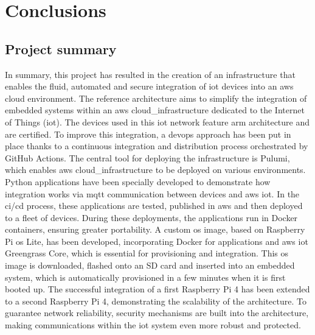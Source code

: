 %


\chapter{Conclusions}
\label{chap:conclusions}

\section{Project summary}

In summary, this project has resulted in the creation of an infrastructure that enables the fluid, automated and secure integration of \acrshort{iot} devices into an \gls{aws} \gls{cloud} environment. The reference architecture aims to simplify the integration of embedded systems within an \gls{aws} \gls{cloud_infrastructure} dedicated to the Internet of Things (\acrshort{iot}). The devices used in this \acrshort{iot} network feature \gls{arm} architecture and are  certified. To improve this integration, a \acrshort{devops} approach has been put in place thanks to a continuous integration and distribution process orchestrated by GitHub Actions. The central tool for deploying the infrastructure is Pulumi, which enables \gls{aws} \gls{cloud_infrastructure} to be deployed on various environments. Python applications have been specially developed to demonstrate how integration works via \acrshort{mqtt} communication between devices and \gls{aws} \acrshort{iot}. In the \acrshort{ci}/\acrshort{cd} process, these applications are tested, published in \gls{aws} and then deployed to a fleet of devices. During these deployments, the applications run in Docker containers, ensuring greater portability. A custom \acrshort{os} image, based on Raspberry Pi \acrshort{os} Lite, has been developed, incorporating Docker for applications and \gls{aws} \acrshort{iot} Greengrass Core, which is essential for provisioning and integration.  This \acrshort{os} image is downloaded, flashed onto an SD card and inserted into an embedded system, which is automatically provisioned in a few minutes when it is first booted up. The successful integration of a first Raspberry Pi 4 has been extended to a second Raspberry Pi 4, demonstrating the scalability of the architecture. To guarantee network reliability, security mechanisms are built into the architecture, making communications within the \acrshort{iot} system even more robust and protected.

